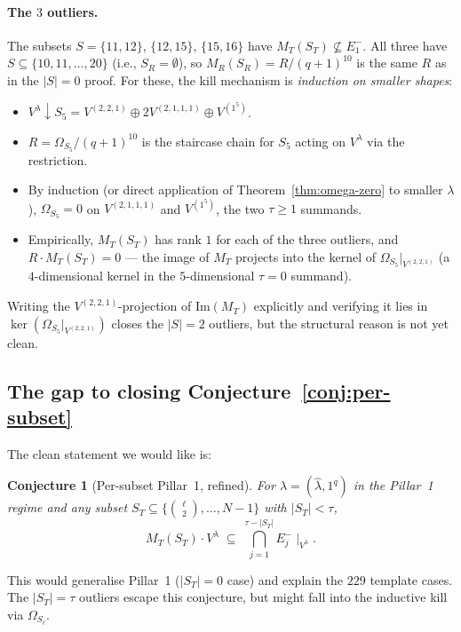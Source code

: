 \documentclass[11pt]{article}
\newtheorem{conjecture}[theorem]{Conjecture}
\theoremstyle{definition}
\newcommand{\Vlam}{V^\lambda}
\newcommand{\Om}{\Omega}
\newcommand{\hatl}{\widehat\lambda}
\newcommand{\Im}{\mathrm{Im}}
\newcommand{\Eminus}[1]{E^-_{#1}}
\begin{document}
\paragraph{The $3$ outliers.}
The subsets $S = \{11,12\}$, $\{12,15\}$, $\{15,16\}$ have $M_T(S_T) \not\subseteq
\Eminus 1$. All three have $S \subseteq \{10, 11, \ldots, 20\}$ (i.e.,
$S_R = \emptyset$), so $M_R(S_R) = R/(q+1)^{10}$ is the same $R$ as in the
$|S|=0$ proof. For these, the kill mechanism is \emph{induction on smaller
shapes}:
\begin{itemize}[topsep=0.2em,itemsep=0.1em]
\item $V^\lambda \downarrow S_5 = V^{(2,2,1)} \oplus 2 V^{(2,1,1,1)}
   \oplus V^{(1^5)}$.
\item $R = \Om_{S_5}/(q+1)^{10}$ is the staircase chain for $S_5$ acting on
   $\Vlam$ via the restriction.
\item By induction (or direct application of Theorem~\ref{thm:omega-zero}
   to smaller $\lambda$), $\Om_{S_5} = 0$ on $V^{(2,1,1,1)}$ and
   $V^{(1^5)}$, the two $\tau \ge 1$ summands.
\item Empirically, $M_T(S_T)$ has rank $1$ for each of the three outliers,
   and $R \cdot M_T(S_T) = 0$ — the image of $M_T$ projects into the
   kernel of $\Om_{S_5}|_{V^{(2,2,1)}}$ (a $4$-dimensional kernel in the
   $5$-dimensional $\tau = 0$ summand).
\end{itemize}
Writing the $V^{(2,2,1)}$-projection of $\Im(M_T)$ explicitly and verifying
it lies in $\ker(\Om_{S_5}|_{V^{(2,2,1)}})$ closes the $|S|=2$ outliers, but
the structural reason is not yet clean.

\subsection{The gap to closing Conjecture~\ref{conj:per-subset}}
\label{sec:gap}

The clean statement we would like is:

\begin{conjecture}[Per-subset Pillar~1, refined]\label{conj:perPillar1-refined}
For $\lambda = (\hatl, 1^q)$ in the Pillar~1 regime and any subset
$S_T \subseteq \{\binom{\ell}{2},\ldots,N-1\}$ with $|S_T| < \tau$,
\[
   M_T(S_T) \cdot V^\lambda \;\subseteq\; \bigcap_{j=1}^{\tau - |S_T|}
   \Eminus j\!\mid_{\Vlam}.
\]
\end{conjecture}

\noindent
This would generalise Pillar~1 ($|S_T|=0$ case) and explain the $229$
template cases. The $|S_T| = \tau$ outliers escape this conjecture, but
might fall into the inductive kill via $\Om_{S_\ell}$.
\end{document}
